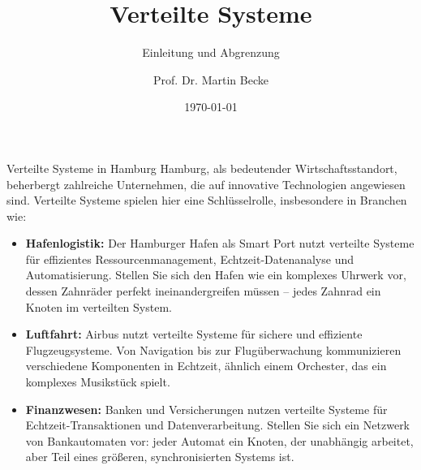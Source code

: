 \documentclass{beamer}
\title{Verteilte Systeme}
\subtitle{Einleitung und Abgrenzung}
\author{Prof. Dr. Martin Becke}
\date{\today}
\begin{document}
\begin{frame}
    \titlepage
\end{frame}

\begin{frame}{Verteilte Systeme in Hamburg}
    Hamburg, als bedeutender Wirtschaftsstandort, beherbergt zahlreiche Unternehmen, die auf innovative Technologien angewiesen sind. Verteilte Systeme spielen hier eine Schlüsselrolle, insbesondere in Branchen wie:

    \begin{itemize}
        \item \textbf{Hafenlogistik:} Der Hamburger Hafen als Smart Port nutzt verteilte Systeme für effizientes Ressourcenmanagement, Echtzeit-Datenanalyse und Automatisierung. Stellen Sie sich den Hafen wie ein komplexes Uhrwerk vor, dessen Zahnräder perfekt ineinandergreifen müssen – jedes Zahnrad ein Knoten im verteilten System.
        \item \textbf{Luftfahrt:} Airbus nutzt verteilte Systeme für sichere und effiziente Flugzeugsysteme.  Von Navigation bis zur Flugüberwachung kommunizieren verschiedene Komponenten in Echtzeit, ähnlich einem Orchester, das ein komplexes Musikstück spielt.
        \item \textbf{Finanzwesen:} Banken und Versicherungen nutzen verteilte Systeme für Echtzeit-Transaktionen und Datenverarbeitung. Stellen Sie sich ein Netzwerk von Bankautomaten vor: jeder Automat ein Knoten, der unabhängig arbeitet, aber Teil eines größeren, synchronisierten Systems ist.
    \end{itemize}

\end{frame}
\end{document}
